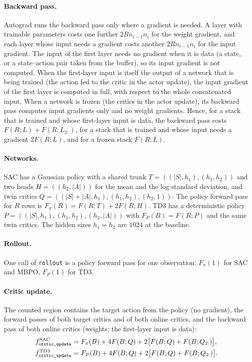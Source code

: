 \paragraph{Backward pass.} Autograd runs the backward pass only where a gradient is needed.
A layer with trainable parameters costs one further $2Rn_{i-1}n_i$ for the weight gradient, and each layer whose input needs a gradient costs another $2Rn_{i-1}n_i$ for the input gradient.
The input of the first layer needs no gradient when it is data (a state, or a state--action pair taken from the buffer), so its input gradient is not computed.
When the first-layer input is itself the output of a network that is being trained (the action fed to the critic in the actor update), the input gradient of the first layer is computed in full, with respect to the whole concatenated input.
When a network is frozen (the critics in the actor update), its backward pass computes input gradients only and no weight gradients.
Hence, for a stack that is trained and whose first-layer input is data, the backward pass costs $F(R;L)+F(R;L_{2:})$, for a stack that is trained and whose input needs a gradient $2F(R;L)$, and for a frozen stack $F(R;L)$.

\paragraph{Networks.} SAC has a Gaussian policy with a shared trunk $T=((|S|,h_1),(h_1,h_2))$ and two heads $H=((h_2,|A|))$ for the mean and the log standard deviation, and twin critics $Q=((|S|+|A|,h_1),(h_1,h_2),(h_2,1))$.
The policy forward pass for $R$ rows is $F_\pi(R)=F(R;T)+2F(R;H)$.
TD3 has a deterministic policy $P=((|S|,h_1),(h_1,h_2),(h_2,|A|))$ with $F_P(R)=F(R;P)$ and the same twin critics.
The hidden sizes $h_1=h_2$ are $1024$ at the baseline.

\paragraph{Rollout.} One call of \texttt{rollout} is a policy forward pass for one observation: $F_\pi(1)$ for SAC and MBPO, $F_P(1)$ for TD3.

\paragraph{Critic update.} The counted region contains the target action from the policy (no gradient), the forward passes of both target critics and of both online critics, and the backward pass of both online critics (weights; the first-layer input is data):
\begin{align}
  f_{\texttt{critic\_\allowbreak update}}^{\mathrm{SAC}} &= F_\pi(B) + 4F(B;Q) + 2\bigl[F(B;Q)+F(B;Q_{2:})\bigr] ,\label{eq:app-critic-sac}\\
  f_{\texttt{critic\_\allowbreak update}}^{\mathrm{TD3}} &= F_P(B) + 4F(B;Q) + 2\bigl[F(B;Q)+F(B;Q_{2:})\bigr] .\label{eq:app-critic-td3}
\end{align}

